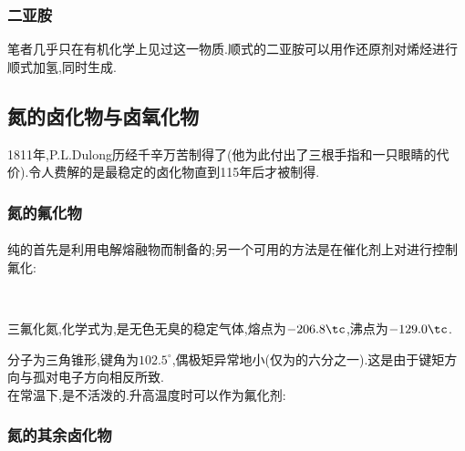 \documentclass{ctexart}
\begin{document}
\subsubsection{二亚胺}
笔者几乎只在有机化学上见过这一物质.顺式的二亚胺可以用作还原剂对烯烃进行顺式加氢,同时生成.
\subsection{氮的卤化物与卤氧化物}
1811年,P.L.Dulong历经千辛万苦制得了(他为此付出了三根手指和一只眼睛的代价).令人费解的是最稳定的卤化物直到115年后才被制得.
\subsubsection{氮的氟化物}
\paragraph{}
纯的首先是利用电解熔融物而制备的;另一个可用的方法是在催化剂上对进行控制氟化:
\begin{center}
    \\
\end{center}
\begin{substance}[\ce{NF3}]
    三氟化氮,化学式为,是无色无臭的稳定气体,熔点为$-206.8\tc$,沸点为$-129.0\tc$.
\end{substance}
分子为三角锥形,键角为$102.5^\circ$,偶极矩异常地小(仅为的六分之一).这是由于键矩方向与孤对电子方向相反所致.\\
\indent 在常温下,是不活泼的.升高温度时可以作为氟化剂:
\begin{center}
\end{center}

\paragraph{}
\paragraph{}
\subsubsection{氮的其余卤化物}
\paragraph{}
\end{document}
